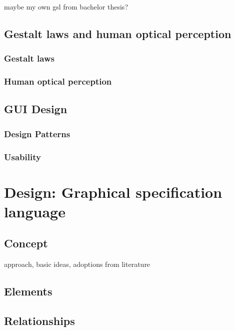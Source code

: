 \documentclass[twoside, openright, 12pt]{book}
\begin{document}
maybe my own gsl from bachelor thesis?



\section{Gestalt laws and human optical perception}
\label{gestalt_laws_and_human_optical_perception}


\subsection{Gestalt laws}
\label{gestalt_laws}


\subsection{Human optical perception}
\label{human_optical_perception}




\section{GUI Design}
\label{gui_design}


\subsection{Design Patterns}
\label{design_patterns}


\subsection{Usability}
\label{usability}




\cleardoublepage
\chapter{Design: Graphical specification language}
\label{gsl_design}


\section{Concept}
\label{gsl_concept}
approach, basic ideas, adoptions from literature

\section{Elements}
\label{gsl_elements}


\section{Relationships}
\label{gsl_relationships}
\end{document}
